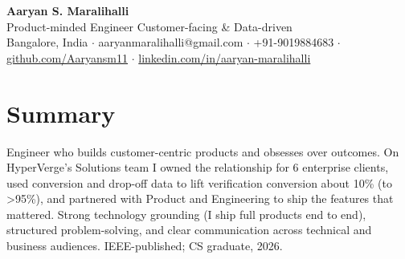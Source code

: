 \documentclass[10pt,a4paper]{article}
\begin{document}
\vspace*{-1cm}
\begin{center}
{\LARGE\bfseries Aaryan S. Maralihalli}\\[0.5em]
{\large Product-minded Engineer  \textbar{}  Customer-facing \& Data-driven}\\[0.3em]
Bangalore, India $\cdot$ aaryanmaralihalli@gmail.com $\cdot$ +91-9019884683 $\cdot$ \href{https://github.com/Aaryansm11}{github.com/Aaryansm11} $\cdot$ \href{https://linkedin.com/in/aaryan-maralihalli}{linkedin.com/in/aaryan-maralihalli}
\end{center}\vspace{0.4ex}
\section*{Summary}
Engineer who builds customer-centric products and obsesses over outcomes. On HyperVerge's Solutions team I owned the relationship for 6 enterprise clients, used conversion and drop-off data to lift verification conversion about 10\% (to \textgreater{}95\%), and partnered with Product and Engineering to ship the features that mattered. Strong technology grounding (I ship full products end to end), structured problem-solving, and clear communication across technical and business audiences. IEEE-published; CS graduate, 2026.\par\vspace{2pt}
\end{document}
